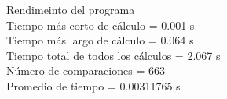 \newpage
{\Huge Rendimeinto del programa } \\
 Tiempo más corto de cálculo = 	0.001 s\\ Tiempo más largo de cálculo = 	0.064 s\\ Tiempo total de todos los cálculos = 	2.067 s\\ Número de comparaciones = 	663\\ Promedio de tiempo = 	0.00311765 s

 \newpage
